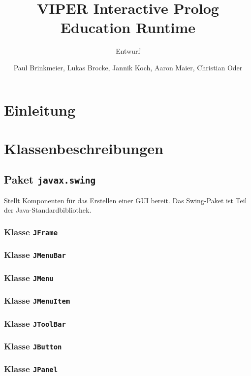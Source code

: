 \documentclass[parskip=full,11pt,twoside]{scrartcl}
\title{VIPER Interactive Prolog Education Runtime}
\subtitle{Entwurf}
\author{Paul Brinkmeier, Lukas Brocke, Jannik Koch, Aaron Maier, Christian Oder}
\begin{document}
\maketitle

\section{Einleitung}

\section{Klassenbeschreibungen}

\subsection{Paket \texttt{javax.swing}}

Stellt Komponenten für das Erstellen einer GUI bereit. Das Swing-Paket ist Teil der Java-Standardbibliothek.

\subsubsection{Klasse \texttt{JFrame}}

\subsubsection{Klasse \texttt{JMenuBar}}

\subsubsection{Klasse \texttt{JMenu}}

\subsubsection{Klasse \texttt{JMenuItem}}

\subsubsection{Klasse \texttt{JToolBar}}

\subsubsection{Klasse \texttt{JButton}}

\subsubsection{Klasse \texttt{JPanel}}
\end{document}
